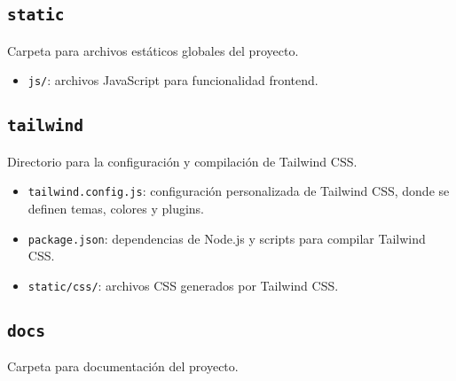 \subsection{\texttt{static}}
Carpeta para archivos estáticos globales del proyecto.

\begin{itemize}
    \item \texttt{js/}: archivos JavaScript para funcionalidad frontend.
\end{itemize}

\subsection{\texttt{tailwind}}
Directorio para la configuración y compilación de Tailwind CSS.

\begin{itemize}
    \item \texttt{tailwind.config.js}: configuración personalizada de Tailwind CSS, donde se definen temas, colores y plugins.
    \item \texttt{package.json}: dependencias de Node.js y scripts para compilar Tailwind CSS.
    \item \texttt{static/css/}: archivos CSS generados por Tailwind CSS.
\end{itemize}

\subsection{\texttt{docs}}
Carpeta para documentación del proyecto.

